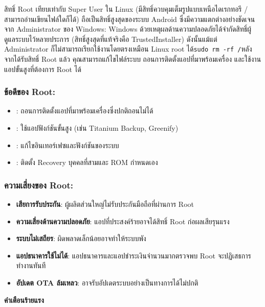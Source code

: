 
สิทธิ์ Root เทียบเท่ากับ Super User ใน Linux (มีสิทธิ์ควบคุมเต็มรูปแบบเหนือไดเรกทอรี / สามารถอ่านเขียนไฟล์ใดก็ได้) ถือเป็นสิทธิ์สูงสุดของระบบ Android ซึ่งมีความแตกต่างอย่างชัดเจนจาก Administrator ของ Windows: Windows ด้วยเหตุผลด้านความปลอดภัยได้จำกัดสิทธิ์ผู้ดูแลระบบไว้หลายประการ (สิทธิ์สูงสุดที่แท้จริงคือ TrustedInstaller) ดังนั้นแม้แต่ Administrator ก็ไม่สามารถเรียกใช้งานโดยตรงเหมือน Linux root ได้\texttt{sudo rm -\allowbreak rf /\allowbreak *}หลังจากได้รับสิทธิ์ Root แล้ว คุณสามารถแก้ไขไฟล์ระบบ ถอนการติดตั้งแอปที่มาพร้อมเครื่อง และใช้งานแอปขั้นสูงที่ต้องการ Root ได้

\subsubsection*{ข้อดีของ Root:}

\begin{itemize}
  \item : ถอนการติดตั้งแอปที่มาพร้อมเครื่องซึ่งปกติถอนไม่ได้
  \item : ใช้แอปฟังก์ชันขั้นสูง (เช่น Titanium Backup, Greenify)
  \item : แก้ไขอินเทอร์เฟซและฟังก์ชันของระบบ
  \item : ติดตั้ง Recovery บุคคลที่สามและ ROM กำหนดเอง
\end{itemize}

\subsubsection*{ความเสี่ยงของ Root:}

\begin{itemize}
  \item \textbf{เสียการรับประกัน}: ผู้ผลิตส่วนใหญ่ไม่รับประกันมือถือที่ผ่านการ Root
  \item \textbf{ความเสี่ยงด้านความปลอดภัย}: แอปที่ประสงค์ร้ายอาจได้สิทธิ์ Root ก่อผลเสียรุนแรง
  \item \textbf{ระบบไม่เสถียร}: ผิดพลาดเล็กน้อยอาจทำให้ระบบพัง
  \item \textbf{แอปธนาคารใช้ไม่ได้}: แอปธนาคารและแอปชำระเงินจำนวนมากตรวจพบ Root จะปฏิเสธการทำงานทันที
  \item \textbf{อัปเดต OTA ล้มเหลว}: อาจรับอัปเดตระบบอย่างเป็นทางการได้ไม่ปกติ
\end{itemize}

\textbf{คำเตือนร้ายแรง}\par

